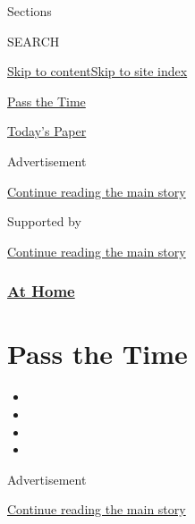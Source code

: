 Sections

SEARCH

\protect\hyperlink{site-content}{Skip to
content}\protect\hyperlink{site-index}{Skip to site index}

\href{https://www.nytimes.com/spotlight/pass-the-time}{Pass the Time}

\href{https://myaccount.nytimes.com/auth/login?response_type=cookie\&client_id=vi}{}

\href{https://www.nytimes.com/section/todayspaper}{Today's Paper}

Advertisement

\protect\hyperlink{after-top}{Continue reading the main story}

Supported by

\protect\hyperlink{after-sponsor}{Continue reading the main story}

\hypertarget{at-home}{%
\subsubsection{\texorpdfstring{\href{/spotlight/at-home}{At
Home}}{At Home}}\label{at-home}}

\hypertarget{pass-the-time}{%
\section{Pass the Time}\label{pass-the-time}}

\begin{itemize}
\item
\item
\item
\item
\end{itemize}

Advertisement

\protect\hyperlink{after-subheader}{Continue reading the main story}


